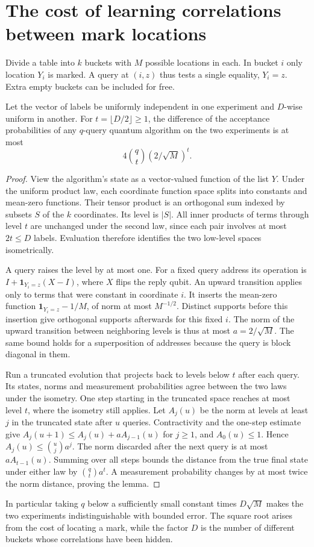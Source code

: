 \documentclass[11pt]{article}
\begin{document}
\section{The cost of learning correlations between mark locations}\label{record}
Divide a table into $k$ buckets with $M$ possible locations in each. In bucket $i$ only location $Y_i$ is marked. A query at $(i,z)$ thus tests a single equality, $Y_i=z$. Extra empty buckets can be included for free.
\begin{lemma}\label{recording}
Let the vector of labels be uniformly independent in one experiment and $D$-wise uniform in another. For $t=\lfloor D/2\rfloor\ge1$, the difference of the acceptance probabilities of any $q$-query quantum algorithm on the two experiments is at most
\[
  4\binom qt(2/\sqrt M)^t.
\]
\end{lemma}
\begin{proof}
View the algorithm's state as a vector-valued function of the list $Y$. Under the uniform product law, each coordinate function space splits into constants and mean-zero functions. Their tensor product is an orthogonal sum indexed by subsets $S$ of the $k$ coordinates. Its level is $|S|$. All inner products of terms through level $t$ are unchanged under the second law, since each pair involves at most $2t\le D$ labels. Evaluation therefore identifies the two low-level spaces isometrically.

A query raises the level by at most one. For a fixed query address its operation is $I+\mathbf{1}_{Y_i=z}(X-I)$, where $X$ flips the reply qubit. An upward transition applies only to terms that were constant in coordinate $i$. It inserts the mean-zero function $\mathbf{1}_{Y_i=z}-1/M$, of norm at most $M^{-1/2}$. Distinct supports before this insertion give orthogonal supports afterwards for this fixed $i$. The norm of the upward transition between neighboring levels is thus at most $a=2/\sqrt M$. The same bound holds for a superposition of addresses because the query is block diagonal in them.

Run a truncated evolution that projects back to levels below $t$ after each query. Its states, norms and measurement probabilities agree between the two laws under the isometry. One step starting in the truncated space reaches at most level $t$, where the isometry still applies. Let $A_j(u)$ be the norm at levels at least $j$ in the truncated state after $u$ queries. Contractivity and the one-step estimate give $A_j(u+1)\le A_j(u)+aA_{j-1}(u)$ for $j\ge1$, and $A_0(u)\le1$. Hence $A_j(u)\le\binom uj a^j$. The norm discarded after the next query is at most $aA_{t-1}(u)$. Summing over all steps bounds the distance from the true final state under either law by $\binom qt a^t$. A measurement probability changes by at most twice the norm distance, proving the lemma.
\end{proof}
In particular taking $q$ below a sufficiently small constant times $D\sqrt M$ makes the two experiments indistinguishable with bounded error. The square root arises from the cost of locating a mark, while the factor $D$ is the number of different buckets whose correlations have been hidden.
\end{document}
